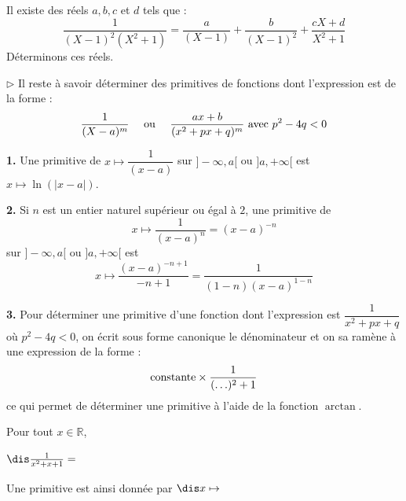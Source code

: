 \documentclass[a4paper,10pt]{report}
\begin{document}
\begin{ex} Il existe des réels $a,b,c$ et $d$ tels que :
$$ \dfrac{1}{(X-1)^2 (X^2+1)} = \frac{a}{(X-1)} + \frac{b}{(X-1)^2} + \frac{cX+d}{X^2+1}$$
Déterminons ces réels.

\vspace{11cm}
\end{ex}

\medskip 

\noindent $\rhd$ Il reste à savoir déterminer des primitives de fonctions dont l'expression est de la forme :
$$ \frac{1}{(X-a)^m} \quad \hbox{ ou }  \quad\frac{ax+b}{(x^2+px+q)^m} \hbox{ avec } p^2-4q<0$$

\medskip


\noindent \textbf{1.} Une primitive de $x \mapsto \dfrac{1}{(x-a)}$ sur $]-\infty,a[$ ou $]a, + \infty[$ est $x \mapsto \ln( \vert x-a \vert)$.

\medskip

\noindent \textbf{2.} Si $n$ est un entier naturel supérieur ou égal à $2$, une primitive de 
$$x \mapsto \dfrac{1}{(x-a)^n}= (x-a)^{-n}$$ sur $]-\infty,a[$ ou $]a, + \infty[$ est 
$$x \mapsto \dfrac{(x-a)^{-n+1}}{-n+1} = \dfrac{1}{(1-n)(x-a)^{1-n}} $$

\medskip

\noindent \textbf{3.} Pour déterminer une primitive d'une fonction dont l'expression est $\dfrac{1}{x^2+px+q}$ où $p^2-4q<0$, on écrit sous forme canonique le dénominateur et on sa ramène à une expression de la forme :
$$ \hbox{constante} \times \frac{1}{(\ldots)^2+1}$$
ce qui permet de déterminer une primitive à l'aide de la fonction $\arctan$. 

\medskip

\begin{ex} Pour tout $x \in \mathbb{R}$,

\medskip
\medskip

\quad \qquad $\dis \frac{1}{x^2+x+1} =$
 
 \vspace{10cm}
% 
% 
% 
\noindent Une primitive est ainsi donnée par $\dis x \mapsto \phantom{\frac{2}{\sqrt{3}} \arctan \left( \frac{2x+1}{\sqrt{3}} \right)\cdot}$
\end{ex}
\end{document}

